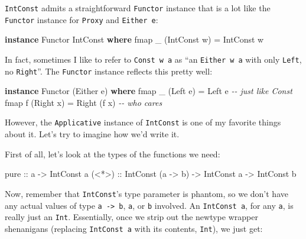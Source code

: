 \documentclass[]{article}
\newenvironment{Shaded}{}{}
\newcommand{\CommentTok}[1]{\textcolor[rgb]{0.38,0.63,0.69}{\textit{#1}}}
\newcommand{\DataTypeTok}[1]{\textcolor[rgb]{0.56,0.13,0.00}{#1}}
\newcommand{\FunctionTok}[1]{\textcolor[rgb]{0.02,0.16,0.49}{#1}}
\newcommand{\KeywordTok}[1]{\textcolor[rgb]{0.00,0.44,0.13}{\textbf{#1}}}
\newcommand{\NormalTok}[1]{#1}
\newcommand{\OtherTok}[1]{\textcolor[rgb]{0.00,0.44,0.13}{#1}}
\begin{document}
\texttt{IntConst} admits a straightforward \texttt{Functor} instance that is a
lot like the \texttt{Functor} instance for \texttt{Proxy} and
\texttt{Either\ e}:

\begin{Shaded}
\begin{Highlighting}[]
\KeywordTok{instance} \DataTypeTok{Functor} \DataTypeTok{IntConst} \KeywordTok{where}
    \FunctionTok{fmap}\NormalTok{ \_ (}\DataTypeTok{IntConst}\NormalTok{ w) }\OtherTok{=} \DataTypeTok{IntConst}\NormalTok{ w}
\end{Highlighting}
\end{Shaded}

In fact, sometimes I like to refer to \texttt{Const\ w\ a} as ``an
\texttt{Either\ w\ a} with only \texttt{Left}, no \texttt{Right}''. The
\texttt{Functor} instance reflects this pretty well:

\begin{Shaded}
\begin{Highlighting}[]
\KeywordTok{instance} \DataTypeTok{Functor}\NormalTok{ (}\DataTypeTok{Either}\NormalTok{ e) }\KeywordTok{where}
    \FunctionTok{fmap}\NormalTok{ \_ (}\DataTypeTok{Left}\NormalTok{ e)  }\OtherTok{=} \DataTypeTok{Left}\NormalTok{ e        }\CommentTok{{-}{-} just like \textquotesingle{}Const\textquotesingle{}}
    \FunctionTok{fmap}\NormalTok{ f (}\DataTypeTok{Right}\NormalTok{ x) }\OtherTok{=} \DataTypeTok{Right}\NormalTok{ (f x)   }\CommentTok{{-}{-} who cares}
\end{Highlighting}
\end{Shaded}

However, the \texttt{Applicative} instance of \texttt{IntConst} is one of my
favorite things about it. Let's try to imagine how we'd write it.

First of all, let's look at the types of the functions we need:

\begin{Shaded}
\begin{Highlighting}[]
\FunctionTok{pure}\OtherTok{  ::}\NormalTok{ a }\OtherTok{{-}\textgreater{}} \DataTypeTok{IntConst}\NormalTok{ a}
\OtherTok{(\textless{}*\textgreater{}) ::} \DataTypeTok{IntConst}\NormalTok{ (a }\OtherTok{{-}\textgreater{}}\NormalTok{ b) }\OtherTok{{-}\textgreater{}} \DataTypeTok{IntConst}\NormalTok{ a }\OtherTok{{-}\textgreater{}} \DataTypeTok{IntConst}\NormalTok{ b}
\end{Highlighting}
\end{Shaded}

Now, remember that \texttt{IntConst}'s type parameter is phantom, so we don't
have any actual values of type \texttt{a\ -\textgreater{}\ b}, \texttt{a}, or
\texttt{b} involved. An \texttt{IntConst\ a}, for any \texttt{a}, is really just
an \texttt{Int}. Essentially, once we strip out the newtype wrapper shenanigans
(replacing \texttt{IntConst\ a} with its contents, \texttt{Int}), we just get:
\end{document}
